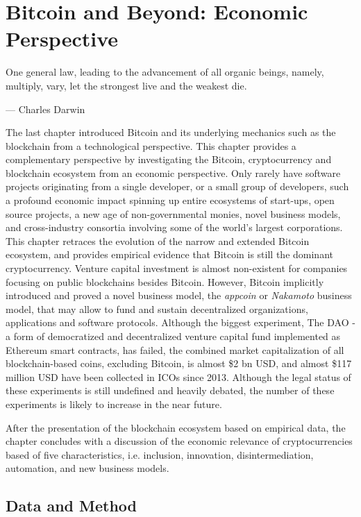 \chapter{Bitcoin and Beyond: Economic Perspective}
\label{sec:ecoystem}

\epigraph{One general law, leading to the advancement of all organic beings, namely, multiply, vary, let the strongest live and the weakest die.}{--- \textup{Charles Darwin}}


The last chapter introduced Bitcoin and its underlying mechanics such as the blockchain from a technological perspective. This chapter provides a complementary perspective by investigating the Bitcoin, cryptocurrency and blockchain ecosystem from an economic perspective. Only rarely have software projects originating from a single developer, or a small group of developers, such a profound economic impact spinning up entire ecosystems of start-ups, open source projects, a new age of non-governmental monies, novel business models, and cross-industry consortia involving some of the world's largest corporations. This chapter retraces the evolution of the narrow and extended Bitcoin ecosystem, and provides empirical evidence that Bitcoin is still the dominant cryptocurrency.
Venture capital investment is almost non-existent for companies focusing on public blockchains besides Bitcoin. However, Bitcoin implicitly introduced and proved a novel business model, the \emph{appcoin} or \emph{Nakamoto} business model, that may allow to fund and sustain decentralized organizations, applications and software protocols. Although the biggest experiment, The DAO - a form of democratized and decentralized venture capital fund implemented as Ethereum smart contracts, has failed, the combined market capitalization of all blockchain-based coins, excluding Bitcoin, is almost \$2 bn USD, and almost \$117 million USD have been collected in \ac{ICO}s since 2013. Although the legal status of these experiments is still undefined and heavily debated, the number of these experiments is likely to increase in the near future. 

After the presentation of the blockchain ecosystem based on empirical data, the chapter concludes with a discussion of the economic relevance of cryptocurrencies based of five characteristics, i.e. inclusion, innovation, disintermediation, automation, and new business models.

\section{Data and Method}

